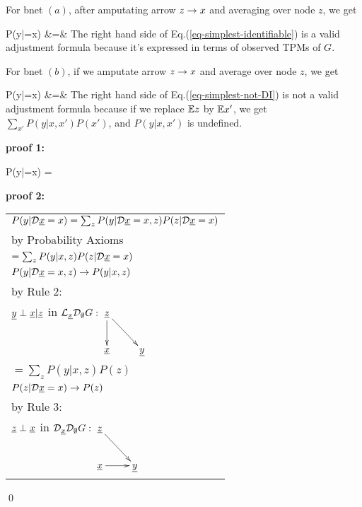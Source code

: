 For bnet $(a)$, after amputating arrow
$z\rightarrow x$ and averaging over node $z$,
we get

\beqa
P(y|\cald\rvx=x)
&=&
\label{eq-simplest-identifiable}
\eeqa
The right hand
side of Eq.(\ref{eq-simplest-identifiable})
is a valid
adjustment formula
because it's expressed in terms
of observed TPMs of $G$.

For bnet $(b)$,
if we amputate arrow
$z\rightarrow x$
and average over node $z$,
we get

\beqa
P(y|\cald \rvx =x)
&=&
\label{eq-simplest-not-DI}
\eeqa
The right hand
side of Eq.(\ref{eq-simplest-not-DI})
is not a valid
adjustment formula
because
if we replace ${ \mathbb{E}} z$ by ${ \mathbb{E}} x' $, we get 
$\sum_{x'}P(y|x, x')P(x')$,
and $P(y|x, x')$ is undefined.






\begin{claim}
\label{cl-decBackDoor}
\decBackDoor
\end{claim}

\proof

{\bf * proof 1:}

\beq
P(y|\cald\rvx=x)
=
\eeq


{\bf * proof 2:}
\begin{longtable}{l}
\color{red}
$P(y|\cald\rvx=x)
=
\sum_z
P(y|\cald\rvx=x, z)
P(z|\cald\rvx=x)$
\\
\quad by Probability Axioms
\\
\color{red}
$=\sum_z
P(y|x, z)
P(z|\cald\rvx=x)$
\\
\quad $P(y|\cald \rvx=x, z)\rarrow
P(y|x, z)$
\\
\quad  by Rule 2:
\\
\quad
$\rvy\perp\rvx|\rvz$ in
$\call_\rvx\cald_\emptyset G:
\xymatrix{
\rvz\ar[d]\ar[rd]
\\
\rvx
&\rvy
}$
\\
\color{red}
$=\sum_z
P(y|x, z)
P(z)$
\\
\quad $P(z|\cald \rvx=x)\rarrow
P(z)$
\\
\quad  by Rule 3:
\\
\quad
$\rvz\perp \rvx$ in
$\cald_\rvx \cald_\emptyset G:
\xymatrix{
\rvz\ar[rd]
\\
\rvx\ar[r]
&\rvy
}
$
\end{longtable}
\qed




